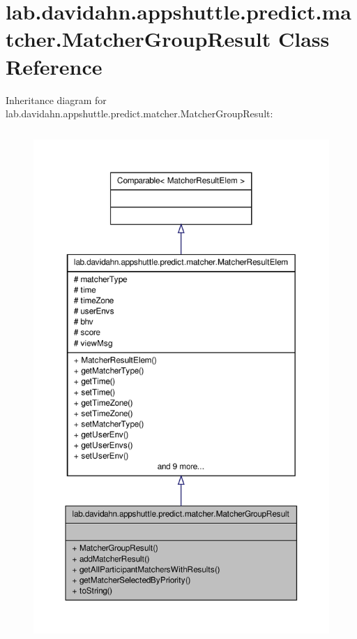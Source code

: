 \hypertarget{classlab_1_1davidahn_1_1appshuttle_1_1predict_1_1matcher_1_1_matcher_group_result}{\section{lab.\-davidahn.\-appshuttle.\-predict.\-matcher.\-Matcher\-Group\-Result \-Class \-Reference}
\label{classlab_1_1davidahn_1_1appshuttle_1_1predict_1_1matcher_1_1_matcher_group_result}
}


\-Inheritance diagram for lab.\-davidahn.\-appshuttle.\-predict.\-matcher.\-Matcher\-Group\-Result\-:
\nopagebreak
\begin{figure}[H]
\begin{center}
\leavevmode
\includegraphics[height=550pt]{classlab_1_1davidahn_1_1appshuttle_1_1predict_1_1matcher_1_1_matcher_group_result__inherit__graph}
\end{center}
\end{figure}


